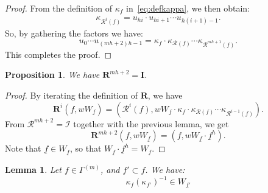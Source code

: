 \documentclass[11pt]{article}
\newtheorem{lemm}[theo]{Lemma}
\newtheorem{prop}[theo]{Proposition}
\theoremstyle{definition}
\newcommand{\RR}{\mathcal{R}}
\newcommand{\II}{\mathcal{I}}
\newcommand{\RRR}{\mathbf{R}}
\newcommand{\III}{\mathbf{I}}
\begin{document}
\begin{proof}
    From the definition of $\kappa_f$ in~\eqref{eq:defkappa}, we then obtain:
    \begin{align}
        \kappa_{\RR^i(f)} = u_{hi} \cdot u_{hi+1} \cdots u_{h(i+1)-1}.
    \end{align}
    So, by gathering the factors we have:
    \[
        u_0 \cdots u_{(mh+2)h-1} 
        =
        \kappa_{f} \cdot \kappa_{\RR(f)} \cdots \kappa_{\RR^{mh+1}(f)}.
    \]
    This completes the proof.
\end{proof}

\begin{prop}
    We have $\RRR^{mh+2} = \III$.
\end{prop}

\begin{proof}
    By iterating the definition of $\RRR$, we have
    \[
        \RRR^i( f , w W_{\underline{f}})
        =
        (\RR^i(f) , w W_{\underline{f}} \cdot \kappa_f \cdot \kappa_{\RR(f)} \cdots \kappa_{\RR^{i-1}(f)} ).
    \] 
    From $\RR^{mh+2} = \II$ together with the previous lemma, we get
    \[
        \RRR^{mh+2}( f , w W_{\underline{f}})
            =
        (f , w W_{\underline{f}} \cdot \underline{f}^h).
    \]
    Note that $\underline{f} \in W_{\underline{f}}$, so that $W_{\underline{f}} \cdot  \underline{f}^h = W_{\underline{f}}$.
\end{proof}



\begin{lemm} \label{lemm_kappakappa}
    Let $f\in\Gamma^{(m)}$, and $f'\subset f$.
    We have:
    \[
        \kappa_f (\kappa_{f'})^{-1}  
            \in
        W_{\underline{f'}}
    \]
\end{lemm}
\end{document}

